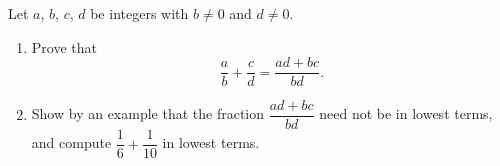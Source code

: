 Let $a$, $b$, $c$, $d$ be integers with $b\ne0$ and $d\ne0$.
\begin{enumerate}
\item[(a)] Prove that
\[\dfrac ab+\dfrac cd=\dfrac{ad+bc}{bd}.\]
\item[(b)] Show by an example that the fraction $\dfrac{ad+bc}{bd}$ need not be in lowest terms, and compute $\dfrac16+\dfrac1{10}$ in lowest terms.
\end{enumerate}

